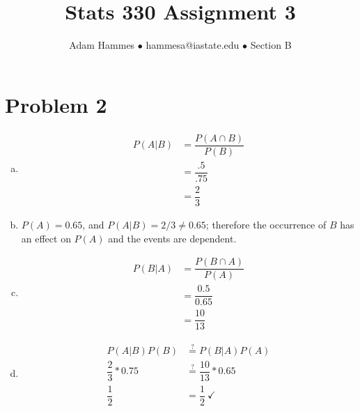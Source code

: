 \documentclass[11pt]{article}
\begin{document}
\title{Stats 330 Assignment 3}
\author{Adam Hammes $\bullet$ hammesa@iastate.edu $\bullet$ Section B}
\maketitle

\section*{Problem 2}
\begin{enumerate}[(a)]
	\item
	\begin{align*}
		P(A|B) &= \dfrac{P(A \cap B)}{P(B)} \\
		&= \dfrac{.5}{.75} \\
		&= \dfrac{2}{3}
	\end{align*}
	
	\item
	$P(A) = 0.65$, and $P(A|B) = 2/3 \neq 0.65$; therefore the occurrence of $B$ has an effect on $P(A)$ and the events are dependent.
	
	\item
	\begin{align*}
		P(B|A) &= \dfrac{P(B \cap A)}{P(A)} \\
		&= \dfrac{0.5}{0.65} \\
		&= \dfrac{10}{13}
	\end{align*}
	
	\item
	\begin{align*}
		P(A|B)P(B) &\overset{?}{=} P(B|A)P(A) \\
		\dfrac{2}{3} * 0.75 &\overset{?}{=} \dfrac{10}{13} * 0.65 \\
		\dfrac{1}{2} &= \dfrac{1}{2} \ \checkmark
	\end{align*}


\end{enumerate}
\end{document}
